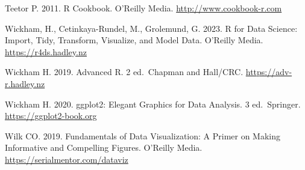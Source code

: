 \documentclass[
  letterpaper,
  DIV=11,
  numbers=noendperiod]{scrartcl}
\begin{document}
Teetor P. 2011. R Cookbook. O'Reilly Media.
\url{http://www.cookbook-r.com}

Wickham, H., Cetinkaya-Rundel, M., Grolemund, G. 2023. R for Data
Science: Import, Tidy, Transform, Visualize, and Model Data. O'Reilly
Media. \url{https://r4ds.hadley.nz}

Wickham H. 2019. Advanced R. 2 ed.~Chapman and Hall/CRC.
\url{https://adv-r.hadley.nz}

Wickham H. 2020. ggplot2: Elegant Graphics for Data Analysis. 3
ed.~Springer. \url{https://ggplot2-book.org}

Wilk CO. 2019. Fundamentals of Data Visualization: A Primer on Making
Informative and Compelling Figures. O'Reilly Media.
\url{https://serialmentor.com/dataviz}
\end{document}

